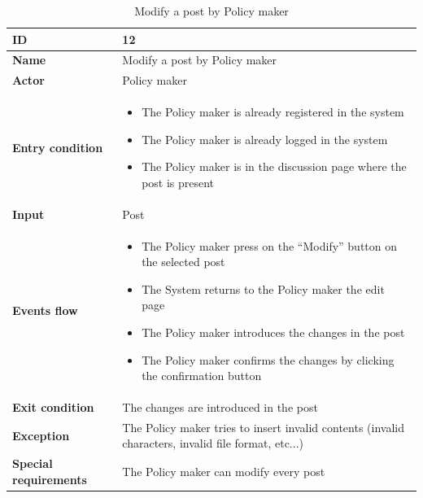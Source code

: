     \begin{longtable}{p{} | p{}}
        \caption{Modify a post by Policy maker}
    \label{tab:pm_modify_post}\\
        \hline
        \textbf{ID} & 12\\
        \hline
        \textbf{Name}  &  Modify a post by Policy maker\\
        \hline
        \textbf{Actor}  &  Policy maker\\
        \hline
        \textbf{Entry condition}  &  \begin{itemize}
            \item  The Policy maker is already registered in the system
            \item  The Policy maker is already logged in the system
            \item  The Policy maker is in the discussion page where the post is present
        \end{itemize}\\
        \hline
        \textbf{Input} & Post\\
        \hline
        \textbf{Events flow} & \begin{itemize}
                \item The Policy maker press on the “Modify” button on the selected post
                \item The System returns to the Policy maker the edit page
                \item The Policy maker introduces the changes in the post
                \item The Policy maker confirms the changes by clicking the confirmation button
                \end{itemize}
                 \\
        \hline
        \textbf{Exit condition} & The changes are introduced in the post\\
        \hline
        \textbf{Exception} & The Policy maker tries to insert invalid contents (invalid characters, invalid file format, etc...)\\ \hline
        \textbf{Special requirements} & The Policy maker can modify every post \\ \hline
    \end{longtable}

